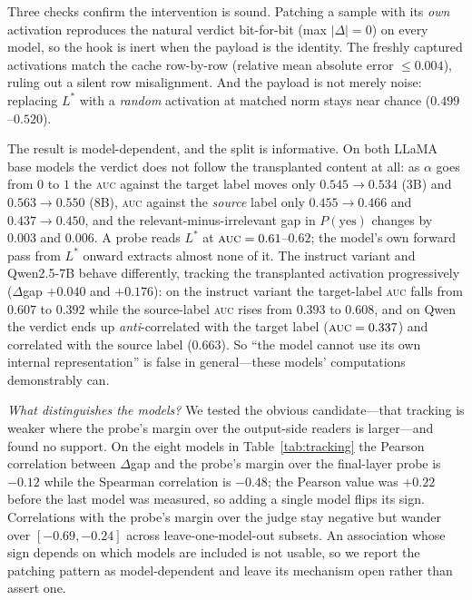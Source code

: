 \documentclass[11pt]{article}
\newcommand{\auc}{\textsc{auc}}
\begin{document}
Three checks confirm the intervention is sound. Patching a sample with its
\emph{own} activation reproduces the natural verdict bit-for-bit
(max $|\Delta|=0$) on every model, so the hook is inert when the payload is the
identity. The freshly captured activations match the cache row-by-row (relative
mean absolute error $\le0.004$), ruling out a silent row misalignment. And the
payload is not merely noise: replacing $L^*$ with a \emph{random} activation at
matched norm stays near chance ($0.499$--$0.520$).

The result is model-dependent, and the split is informative. On both LLaMA base
models the verdict does not follow the transplanted content at all: as $\alpha$
goes from $0$ to $1$ the \auc{} against the target label moves only
$0.545\!\to\!0.534$ (3B) and $0.563\!\to\!0.550$ (8B), \auc{} against the
\emph{source} label only $0.455\!\to\!0.466$ and $0.437\!\to\!0.450$, and the
relevant-minus-irrelevant gap in $P(\text{yes})$ changes by $0.003$ and
$0.006$. A probe reads $L^*$ at $\auc=0.61$--$0.62$; the model's own forward
pass from $L^*$ onward extracts almost none of it. The instruct variant and
Qwen2.5-7B behave differently, tracking the transplanted activation
progressively ($\Delta$gap $+0.040$ and $+0.176$): on the instruct variant the
target-label \auc{} falls from $0.607$ to $0.392$ while the source-label \auc{}
rises from $0.393$ to $0.608$, and on Qwen the verdict ends up
\emph{anti}-correlated with the target label ($\auc=0.337$) and correlated with
the source label ($0.663$). So ``the model cannot use its own internal
representation'' is false in general---these models' computations demonstrably
can.

\emph{What distinguishes the models?} We tested the obvious candidate---that
tracking is weaker where the probe's margin over the output-side readers is
larger---and found no support. On the eight models in Table~\ref{tab:tracking}
the Pearson correlation between $\Delta$gap and the probe's margin over the
final-layer probe is $-0.12$ while the Spearman correlation is $-0.48$; the
Pearson value was $+0.22$ before the last model was measured, so adding a single
model flips its sign. Correlations with the probe's margin over the judge stay
negative but wander over $[-0.69,-0.24]$ across leave-one-model-out subsets. An
association whose sign depends on which models are included is not usable, so we
report the patching pattern as model-dependent and leave its mechanism open
rather than assert one.
\end{document}
